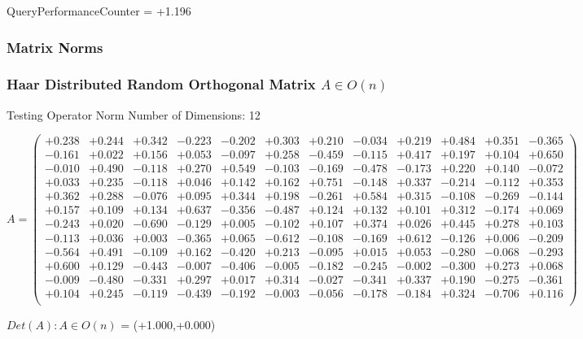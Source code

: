 \documentclass[9pt]{article}
\theoremstyle{plain}
\theoremstyle{definition}
\theoremstyle{remark}
\numberwithin{equation}{section}
\begin{document}
QueryPerformanceCounter  =  +1.196
\subsubsection{Matrix Norms}
\subsubsection{Haar Distributed Random Orthogonal Matrix $A \in O(n)$}
 Testing Operator Norm
Number of Dimensions: 12

$A = \left(
\begin{array}{
cccccccccccc}
+0.238 & +0.244 & +0.342 & -0.223 & -0.202 & +0.303 & +0.210 & -0.034 & +0.219 & +0.484 & +0.351 & -0.365 \\
-0.161 & +0.022 & +0.156 & +0.053 & -0.097 & +0.258 & -0.459 & -0.115 & +0.417 & +0.197 & +0.104 & +0.650 \\
-0.010 & +0.490 & -0.118 & +0.270 & +0.549 & -0.103 & -0.169 & -0.478 & -0.173 & +0.220 & +0.140 & -0.072 \\
+0.033 & +0.235 & -0.118 & +0.046 & +0.142 & +0.162 & +0.751 & -0.148 & +0.337 & -0.214 & -0.112 & +0.353 \\
+0.362 & +0.288 & -0.076 & +0.095 & +0.344 & +0.198 & -0.261 & +0.584 & +0.315 & -0.108 & -0.269 & -0.144 \\
+0.157 & +0.109 & +0.134 & +0.637 & -0.356 & -0.487 & +0.124 & +0.132 & +0.101 & +0.312 & -0.174 & +0.069 \\
-0.243 & +0.020 & -0.690 & -0.129 & +0.005 & -0.102 & +0.107 & +0.374 & +0.026 & +0.445 & +0.278 & +0.103 \\
-0.113 & +0.036 & +0.003 & -0.365 & +0.065 & -0.612 & -0.108 & -0.169 & +0.612 & -0.126 & +0.006 & -0.209 \\
-0.564 & +0.491 & -0.109 & +0.162 & -0.420 & +0.213 & -0.095 & +0.015 & +0.053 & -0.280 & -0.068 & -0.293 \\
+0.600 & +0.129 & -0.443 & -0.007 & -0.406 & -0.005 & -0.182 & -0.245 & -0.002 & -0.300 & +0.273 & +0.068 \\
-0.009 & -0.480 & -0.331 & +0.297 & +0.017 & +0.314 & -0.027 & -0.341 & +0.337 & +0.190 & -0.275 & -0.361 \\
+0.104 & +0.245 & -0.119 & -0.439 & -0.192 & -0.003 & -0.056 & -0.178 & -0.184 & +0.324 & -0.706 & +0.116 \\
\end{array}
\right)$ \newline 

$Det(A) :   A \in O(n)$ = (+1.000,+0.000)
\end{document}
